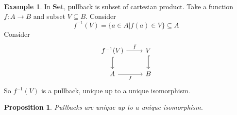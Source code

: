 \documentclass[11pt]{article} %
\newtheorem{proposition}[theorem]{Proposition}
\theoremstyle{definition}
\theoremstyle{definition}
\theoremstyle{definition}
\newtheorem{example/}[theorem]{Example}
\newenvironment{example}
  {\renewcommand{\qedsymbol}{$\blacktriangle$}%
   \pushQED{\qed}\begin{example/}}
  {\popQED\end{example/}}
\begin{document}
\begin{example}
    In \textbf{Set}, pullback is subset of cartesian product.
    Take a function $f:A\rightarrow B$ and subset $V\subseteq B$. Consider
    \[f^{-1}(V) = \{a\in A | f(a)\in V\} \subseteq A\]
    Consider
\[\begin{tikzcd}
	{f^{-1}(V)} & V \\
	A & B
	\arrow["{\bar{f}}", from=1-1, to=1-2]
	\arrow[hook, from=1-1, to=2-1]
	\arrow["f"', from=2-1, to=2-2]
	\arrow[hook, from=1-2, to=2-2]
\end{tikzcd}\]
So $f^{-1}(V)$ is a pullback, unique up to a unique isomorphism.
\end{example}
\begin{proposition}
    Pullbacks are unique up to a unique isomorphism.
\end{proposition}
\end{document}
